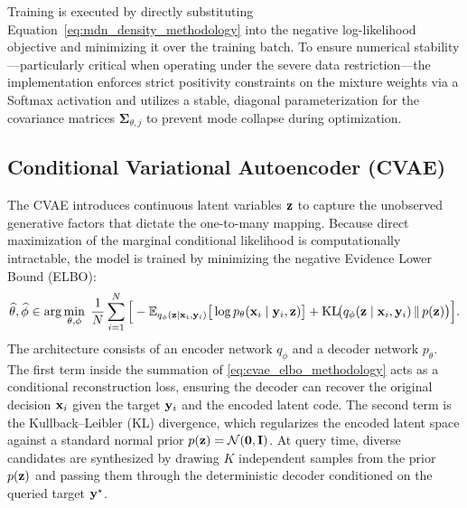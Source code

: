 Training is executed by directly substituting Equation~\eqref{eq:mdn_density_methodology} into the negative log-likelihood objective and minimizing it over the training batch. To ensure numerical stability—particularly critical when operating under the severe data restriction—the implementation enforces strict positivity constraints on the mixture weights via a Softmax activation and utilizes a stable, diagonal parameterization for the covariance matrices $\boldsymbol{\Sigma}_{\theta,j}$ to prevent mode collapse during optimization.

\subsection{Conditional Variational Autoencoder (CVAE)}\label{subsec:cvae_training}

The CVAE introduces continuous latent variables $\mathbf{z}$ to capture the unobserved generative factors that dictate the one-to-many mapping. Because direct maximization of the marginal conditional likelihood is computationally intractable, the model is trained by minimizing the negative Evidence Lower Bound (ELBO):
\begin{equation}
  \widehat{\theta},\widehat{\phi}\in\arg\min_{\theta,\phi}\;
  \frac{1}{N}\sum_{i=1}^{N}\Big[
    - \mathbb{E}_{q_{\phi}(\mathbf{z}\mid\mathbf{x}_i,\mathbf{y}_i)} \big[ \log p_{\theta}(\mathbf{x}_i\mid\mathbf{y}_i,\mathbf{z}) \big]
    + \mathrm{KL}\!\big(q_{\phi}(\mathbf{z}\mid\mathbf{x}_i,\mathbf{y}_i)\,\|\,p(\mathbf{z})\big)
  \Big].
  \label{eq:cvae_elbo_methodology}
\end{equation}
The architecture consists of an encoder network $q_{\phi}$ and a decoder network $p_{\theta}$. The first term inside the summation of \eqref{eq:cvae_elbo_methodology} acts as a conditional reconstruction loss, ensuring the decoder can recover the original decision $\mathbf{x}_i$ given the target $\mathbf{y}_i$ and the encoded latent code. The second term is the Kullback--Leibler (KL) divergence, which regularizes the encoded latent space against a standard normal prior $p(\mathbf{z}) = \mathcal{N}(\mathbf{0}, \mathbf{I})$. At query time, diverse candidates are synthesized by drawing $K$ independent samples from the prior $p(\mathbf{z})$ and passing them through the deterministic decoder conditioned on the queried target $\mathbf{y}^{\star}$.

